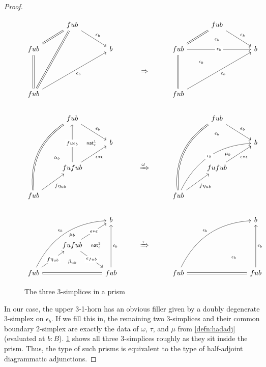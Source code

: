 \documentclass[12pt]{amsart}
\theoremstyle{plain}
\theoremstyle{definition}
\theoremstyle{remark}
\numberwithin{equation}{section}
\begin{document}
\begin{proof}
  \begin{figure}
    \centering
\[
  \begin{tikzcd}[ampersand replacement=\&]
    \& fub \ar[dr,"\epsilon_b"] \& \& \&    \& fub \ar[dr,"\epsilon_b"] \ar[d,phantom,"\scriptstyle \epsilon_b"]\\
    fub \ar[ur,equals] \&\& b\& \&     fub \ar[ur,equals] \ar[rr,"\epsilon_b" description] \& ~ \& b\\
    \& \& \& \Rightarrow \&    \& \ar[ul,phantom,"\scriptstyle \epsilon_b"]\\
    fub \ar[uu,equals] \ar[ruuu,equals] \ar[rruu,"\epsilon_b"']\& \& \& \&    fub \ar[uu,equals] \ar[rruu,"\epsilon_b"']
\\
    \& fub \ar[dr,"\epsilon_b"]\& \& \&   \& fub \ar[dr,"\epsilon_b"] \ar[dd,phantom,"\scriptstyle \epsilon_b" near start] \& ~\\
    ~\& ~ \ar[r,phantom,"\scriptstyle \mathsf{nat}^1_{\epsilon}"] \& b \& \&      \& ~ \& b\\
    \& fufub \ar[ul,phantom,"\scriptstyle \alpha_b" near start] \ar[uu,"fu\epsilon_b" description] \ar[ur,"\epsilon\ast\epsilon"'] \& \& \xRightarrow{\omega} \&    \& fufub \ar[ur,"\epsilon\ast\epsilon"'] \ar[uur,phantom,"\scriptstyle \mu_b" pos=.2] \\
    fub \ar[ur,"f\eta_{ub}"']  \ar[ruuu,equals,bend left] \&~\& \& \&  fub \ar[uuur,equals,bend left] \ar[rruu,bend left,"\epsilon_b" description] \ar[ur,"f\eta_{ub}"']\\
    \&~\& b \& \&     \& \& b\\
    \& fufub \ar[dr,"\epsilon_{fub}" description] \ar[ur,"\epsilon\ast\epsilon" description] \ar[u,phantom,"\scriptstyle \mu_b" pos=.3]
    \ar[d,phantom,"\scriptstyle \beta_{ub}"]  \ar[r,phantom,"\scriptstyle \mathsf{nat}^2_{\epsilon}"] \& ~ \& \xRightarrow{\tau} \&    \& \ar[dr,phantom,"\scriptstyle \epsilon_b"]\& \\
    fub \ar[ur,"f\eta_{ub}" description] \ar[rr,equals] \ar[rruu,bend left,"\epsilon_b"] \&~\& fub\ar[uu,"\epsilon_b"']
\& \& 
    fub \ar[rr,equals] \ar[rruu,bend left, "\epsilon_b"] \&\& fub \ar[uu,"\epsilon_b"']
  \end{tikzcd}
\]
\caption{The three 3-simplices in a prism}
    \label{fig:three-3simplices}
  \end{figure}
  In our case, the upper 3-1-horn has an obvious filler given by a doubly degenerate 3-simplex on $\epsilon_b$.
  If we fill this in, the remaining two 3-simplices and their common boundary 2-simplex are exactly the data of $\omega$, $\tau$, and $\mu$ from \cref{defn:hadadj} (evaluated at $b:B$).
  \cref{fig:three-3simplices} shows all three 3-simplices roughly as they sit inside the prism.
  Thus, the type of such prisms is equivalent to the type of half-adjoint diagrammatic adjunctions.
\end{proof}
\end{document}
